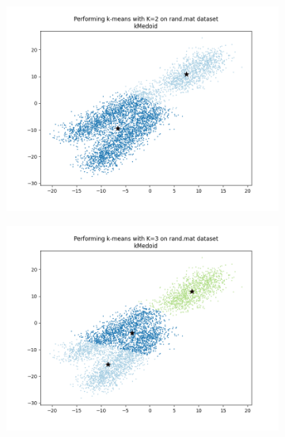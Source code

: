 \documentclass[12pt, a4paper]{article}
\begin{document}
\begin{figure}[h]
    \centering
    \begin{subfigure}{.45\linewidth}
        \includegraphics[width=\linewidth]{images/q3/c/2.png}
    \end{subfigure}
    \hfill
    \begin{subfigure}{.45\linewidth}
        \includegraphics[width=\linewidth]{images/q3/c/3.png}
    \end{subfigure}
    \newline
    \begin{subfigure}{.45\linewidth}

\end{subfigure}
\end{figure}
\end{document}

